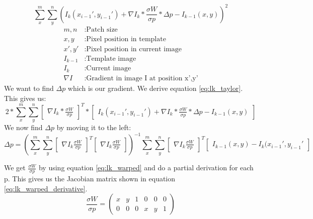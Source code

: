 \documentclass[11pt,a4paper,titlepage,oneside]{report}
\begin{document}
\begin{equation}\label{eq:lk_taylor}
  \sum_x^m\sum_y^n(I_{k}(x_{i-1}',y_{i-1}')+\nabla I_{k}*\frac{\sigma W}{\sigma p}*\Delta p-I_{k-1}(x,y))^2
\end{equation}
\begin{align*}
	m,n				 &: \text{Patch size}\\
  x,y        &: \text{Pixel position in template}\\
  x',y'      &: \text{Pixel position in current image}\\
  I_{k-1}    &: \text{Template image}\\
  I_{k}      &: \text{Current image}\\
  \nabla I  &:  \text{Gradient in image I at position x',y'}
\end{align*}
We want to find $\Delta p$ which is our gradient. We derive equation \ref{eq:lk_taylor}. This gives us:
\begin{equation}
  2*\sum_x^m\sum_y^n\begin{bmatrix}\nabla I_{k}*\frac{\sigma W}{\sigma p}\end{bmatrix}^T*\begin{bmatrix}I_{k}(x_{i-1}',y_{i-1}')+\nabla I_{k}*\frac{\sigma W}{\sigma p}*\Delta p-I_{k-1}(x,y)\end{bmatrix}
\end{equation}
We now find $\Delta p$ by moving it to the left:
\tiny
\begin{equation}\label{eq:lk_dp}
  \Delta p=(\sum_x^m\sum_y^n\begin{bmatrix}\nabla I_{k}\frac{\sigma W}{\sigma p}\end{bmatrix}^T\begin{bmatrix}\nabla I_{k}\frac{\sigma W}{\sigma p}\end{bmatrix})^{-1}
  \sum_x^m\sum_y^n\begin{bmatrix}\nabla I_{k}\frac{\sigma W}{\sigma p}\end{bmatrix}^T\begin{bmatrix}I_{k-1}(x,y) - I_{k}(x_{i-1}',y_{i-1}'\end{bmatrix}
\end{equation}
\normalsize

We get $\frac{\sigma W}{\sigma p}$ by using equation \ref{eq:lk_warped} and do a partial derivation for each p. This gives us the Jacobian matrix shown in equation \ref{eq:lk_warped_derivative}.
\begin{equation}\label{eq:lk_warped_derivative}
  \frac{\sigma W}{\sigma p}=
  \begin{pmatrix}
    x & y & 1 & 0 & 0 & 0 \\
    0 & 0 & 0 & x & y & 1
  \end{pmatrix}
\end{equation}
\end{document}
